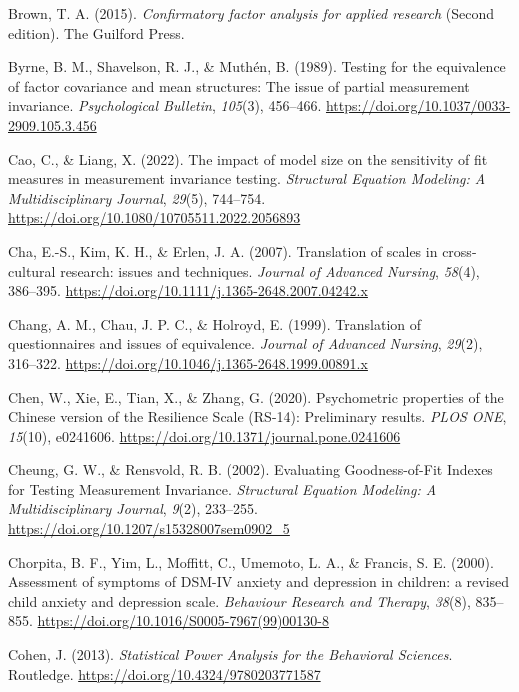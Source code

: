 \documentclass[
  man]{apa7}
\newlength{\cslhangindent}
\newenvironment{CSLReferences}[2] %
 {\begin{list}{}{%
  \setlength{\itemindent}{0pt}
  \setlength{\leftmargin}{0pt}
  \setlength{\parsep}{0pt}
  \ifodd #1
   \setlength{\leftmargin}{\cslhangindent}
   \setlength{\itemindent}{-1\cslhangindent}
  \fi
  \setlength{\itemsep}{#2\baselineskip}}}
 {\end{list}}
\begin{document}
\begin{CSLReferences}{1}{0}
Brown, T. A. (2015). \emph{Confirmatory factor analysis for applied research} (Second edition). The Guilford Press.

Byrne, B. M., Shavelson, R. J., \& Muthén, B. (1989). Testing for the equivalence of factor covariance and mean structures: The issue of partial measurement invariance. \emph{Psychological Bulletin}, \emph{105}(3), 456--466. \url{https://doi.org/10.1037/0033-2909.105.3.456}

Cao, C., \& Liang, X. (2022). The impact of model size on the sensitivity of fit measures in measurement invariance testing. \emph{Structural Equation Modeling: A Multidisciplinary Journal}, \emph{29}(5), 744--754. \url{https://doi.org/10.1080/10705511.2022.2056893}

Cha, E.-S., Kim, K. H., \& Erlen, J. A. (2007). Translation of scales in cross{-}cultural research: issues and techniques. \emph{Journal of Advanced Nursing}, \emph{58}(4), 386--395. \url{https://doi.org/10.1111/j.1365-2648.2007.04242.x}

Chang, A. M., Chau, J. P. C., \& Holroyd, E. (1999). Translation of questionnaires and issues of equivalence. \emph{Journal of Advanced Nursing}, \emph{29}(2), 316--322. \url{https://doi.org/10.1046/j.1365-2648.1999.00891.x}

Chen, W., Xie, E., Tian, X., \& Zhang, G. (2020). Psychometric properties of the Chinese version of the Resilience Scale (RS-14): Preliminary results. \emph{PLOS ONE}, \emph{15}(10), e0241606. \url{https://doi.org/10.1371/journal.pone.0241606}

Cheung, G. W., \& Rensvold, R. B. (2002). Evaluating Goodness-of-Fit Indexes for Testing Measurement Invariance. \emph{Structural Equation Modeling: A Multidisciplinary Journal}, \emph{9}(2), 233--255. \url{https://doi.org/10.1207/s15328007sem0902_5}

Chorpita, B. F., Yim, L., Moffitt, C., Umemoto, L. A., \& Francis, S. E. (2000). Assessment of symptoms of DSM-IV anxiety and depression in children: a revised child anxiety and depression scale. \emph{Behaviour Research and Therapy}, \emph{38}(8), 835--855. \url{https://doi.org/10.1016/S0005-7967(99)00130-8}

Cohen, J. (2013). \emph{Statistical Power Analysis for the Behavioral Sciences}. Routledge. \url{https://doi.org/10.4324/9780203771587}


\end{CSLReferences}
\end{document}
